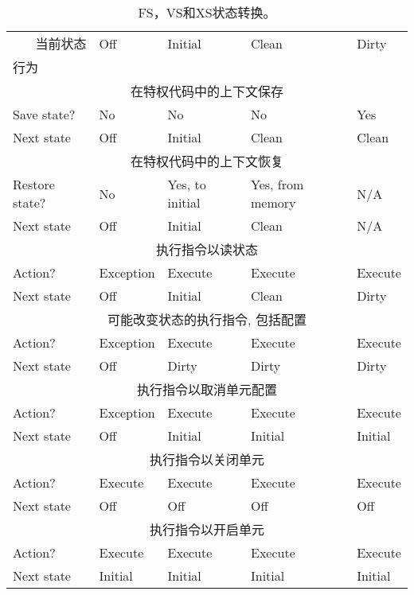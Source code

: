 \begin{table*}[h!]
  \begin{center}
  \begin{tabular}{|l|l|l|l|l|}
  \hline
  \multicolumn{1}{|r|}{当前状态} & Off & Initial & Clean & Dirty \\
  行为 & & & &\\
  \hline
  \hline
  \multicolumn{5}{|c|}{在特权代码中的上下文保存}\\
  \hline
  Save state?    & No         & No        & No     & Yes \\
  Next state       & Off        & Initial   & Clean  & Clean \\
  \hline
  \hline
  \multicolumn{5}{|c|}{在特权代码中的上下文恢复}\\
  \hline
  Restore state? & No        & Yes, to initial & Yes, from memory   & N/A \\
  Next state     & Off       & Initial   & Clean  & N/A \\
  \hline
  \hline
  \multicolumn{5}{|c|}{执行指令以读状态}\\
  \hline
  Action?        & Exception & Execute   & Execute & Execute \\
  Next state     & Off       & Initial   & Clean  & Dirty \\
  \hline
  \hline
  \multicolumn{5}{|c|}{可能改变状态的执行指令, 包括配置}\\
  \hline
  Action?        & Exception & Execute & Execute & Execute \\
  Next state     & Off       & Dirty   & Dirty  & Dirty \\
  \hline
  \hline
  \multicolumn{5}{|c|}{执行指令以取消单元配置}\\
  \hline
  Action?        & Exception & Execute & Execute & Execute \\
  Next state     & Off       & Initial & Initial & Initial \\
  \hline
  \hline
  \multicolumn{5}{|c|}{执行指令以关闭单元}\\
  \hline
  Action?        & Execute   & Execute & Execute & Execute \\
  Next state     & Off       & Off     & Off     & Off \\
  \hline
  \hline
  \multicolumn{5}{|c|}{执行指令以开启单元}\\
  \hline
  Action?        & Execute   & Execute & Execute & Execute \\
  Next state     & Initial   & Initial & Initial & Initial   \\
  \hline
  \end{tabular}
  \end{center}
  \caption{FS，VS和XS状态转换。}
  \label{fsxsstates}
  \end{table*}

